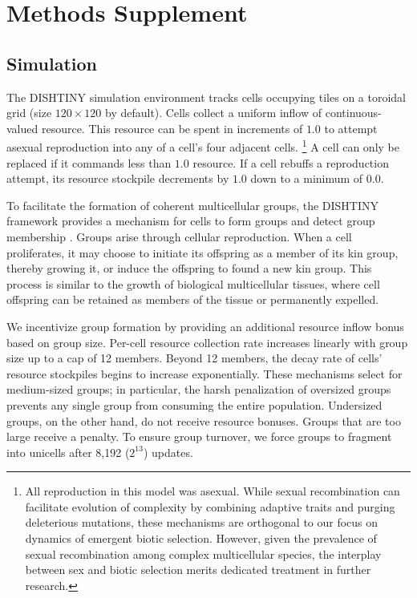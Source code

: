 



\section{Methods Supplement} \label{sec:methods-supp}

\subsection{Simulation}



The DISHTINY simulation environment tracks cells occupying tiles on a toroidal grid (size $120\times120$ by default).
Cells collect a uniform inflow of continuous-valued resource.
This resource can be spent in increments of $1.0$ to attempt asexual reproduction into any of a cell's four adjacent cells.
\unskip\footnote{%
All reproduction in this model was asexual.
While sexual recombination can facilitate evolution of complexity by combining adaptive traits and purging deleterious mutations, these mechanisms are orthogonal to our focus on dynamics of emergent biotic selection.
However, given the prevalence of sexual recombination among complex multicellular species, the interplay between sex and biotic selection merits dedicated treatment in further research.
}
A cell can only be replaced if it commands less than $1.0$ resource.
If a cell rebuffs a reproduction attempt, its resource stockpile decrements by $1.0$ down to a minimum of $0.0$.

To facilitate the formation of coherent multicellular groups, the DISHTINY framework provides a mechanism for cells to form groups and detect group membership .
Groups arise through cellular reproduction.
When a cell proliferates, it may choose to initiate its offspring as a member of its kin group, thereby growing it, or induce the offspring to found a new kin group.
This process is similar to the growth of biological multicellular tissues, where cell offspring can be retained as members of the tissue or permanently expelled.

We incentivize group formation by providing an additional resource inflow bonus based on group size.
Per-cell resource collection rate increases linearly with group size up to a cap of 12 members.
Beyond 12 members, the decay rate of cells' resource stockpiles begins to increase exponentially.
These mechanisms select for medium-sized groups; in particular, the harsh penalization of oversized groups prevents any single group from consuming the entire population.
Undersized groups, on the other hand, do not receive resource bonuses.
Groups that are too large receive a penalty.
To ensure group turnover, we force groups to fragment into unicells after 8,192 ($2^{13}$) updates.

